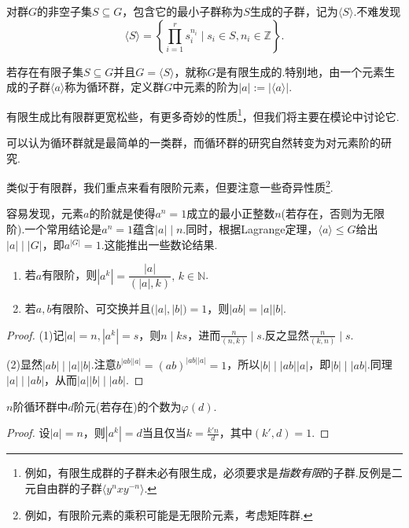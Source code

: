 \begin{definition}
	对群$G$的非空子集$S\subseteq G$，包含它的最小子群称为$S${\heiti 生成的子群}，记为$\langle S\rangle$.不难发现
	\[
		\langle S\rangle=\left\{\prod_{i=1}^rs_i^{n_i}\mid s_i\in S,n_i\in\mathbb{Z}\right\}.
	\]

	若存在有限子集$S\subseteq G$并且$G=\langle S\rangle$，就称$G$是{\heiti 有限生成的}.特别地，由一个元素生成的子群$\langle a\rangle$称为{\heiti 循环群}，定义群$G$中元素的{\heiti 阶}为$|a|:=|\langle a\rangle|$.
\end{definition}
\begin{remark}
	有限生成比有限群更宽松些，有更多奇妙的性质\footnote{例如，有限生成群的子群未必有限生成，必须要求是\emph{指数有限}的子群.反例是二元自由群的子群$\langle y^nxy^{-n}\rangle$.}，但我们将主要在模论中讨论它.
\end{remark}

可以认为循环群就是最简单的一类群，而循环群的研究自然转变为对元素阶的研究.

类似于有限群，我们重点来看有限阶元素，但要注意一些奇异性质\footnote{例如，有限阶元素的乘积可能是无限阶元素，考虑矩阵群.}.

容易发现，元素$a$的阶就是使得$a^n=1$成立的最小正整数$n$(若存在，否则为无限阶).一个常用结论是$a^n=1$蕴含$|a|\mid n$.同时，根据Lagrange定理，$\langle a\rangle \le G$给出$|a|\mid|G|$，即$a^{|G|}=1$.这能推出一些数论结果.
\begin{prop}
	\begin{enumerate}
		\item 若$a$有限阶，则$|a^k|=\dfrac{|a|}{(|a|,k)},\,k\in\mathbb{N}$.
		\item 若$a,b$有限阶、可交换并且$\big(|a|,|b|\big)=1$，则$|ab|=|a||b|$.
	\end{enumerate}
\end{prop}
\begin{proof}
	\hspace*{5.4pt}(1)记$|a|=n,|a^k|=s$，则$n\mid ks$，进而$\frac{n}{(n,k)}\mid s$.反之显然$\frac{n}{(k,n)}\mid s$.

	(2)显然$|ab|\mid|a||b|$.注意$b^{|ab||a|}=(ab)^{|ab||a|}=1$，所以$|b|\mid |ab||a|$，即$|b|\mid|ab|$.同理$|a|\mid|ab|$，从而$|a||b|\mid|ab|$.
\end{proof}
\begin{cor}
	$n$阶循环群中$d$阶元(若存在)的个数为$\varphi(d)$.
\end{cor}
\begin{proof}
	设$|a|=n$，则$|a^k|=d$当且仅当$k=\frac{k'n}{d}$，其中$(k',d)=1$.
\end{proof}


